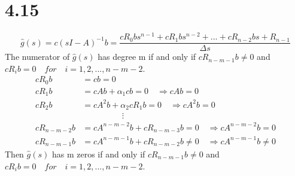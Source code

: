 \documentclass{article}
\begin{document}
\section*{4.15}
$$\hat{g}(s)=c(sI-A)^{-1}b=\frac{cR_{0}bs^{n-1}+cR_{1}bs^{n-2}+...+cR_{n-2}bs+R_{n-1}}
{\Delta s}$$
The numerator of $\hat{g}(s)$ has degree m if and only if
$cR_{n-m-1}b\neq 0$ and $ cR_{i}b=0 \quad for \quad i=1,2,...,n-m-2$.
$$
\begin{aligned}
cR_{0}b&=cb=0\\
cR_{1}b&=cAb+\alpha_{1}cb=0 \quad \Rightarrow cAb=0\\
cR_{2}b&=cA^{2}b+\alpha_{2}cR_{1}b=0 \quad \Rightarrow cA^{2}b=0\\
&\hspace{2cm}\vdots\\
cR_{n-m-2}b&=cA^{n-m-2}b+cR_{n-m-3}b=0 \quad \Rightarrow cA^{n-m-2}b=0\\
cR_{n-m-1}b&=cA^{n-m-1}b+cR_{n-m-2}b\neq 0 \quad \Rightarrow cA^{n-m-1}b\neq 0
\end{aligned}
$$
Then $\hat{g}(s)$ has m zeros if and only if $cR_{n-m-1}b\neq 0$ and $ cR_{i}b=0\quad for \quad i=1,2,...,n-m-2$.
\end{document}
